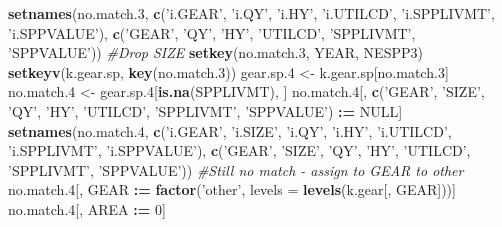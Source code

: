 \documentclass[]{article}
\newenvironment{Shaded}{\begin{snugshade}}{\end{snugshade}}
\newcommand{\KeywordTok}[1]{\textcolor[rgb]{0.13,0.29,0.53}{\textbf{#1}}}
\newcommand{\DataTypeTok}[1]{\textcolor[rgb]{0.13,0.29,0.53}{#1}}
\newcommand{\DecValTok}[1]{\textcolor[rgb]{0.00,0.00,0.81}{#1}}
\newcommand{\StringTok}[1]{\textcolor[rgb]{0.31,0.60,0.02}{#1}}
\newcommand{\CommentTok}[1]{\textcolor[rgb]{0.56,0.35,0.01}{\textit{#1}}}
\newcommand{\OtherTok}[1]{\textcolor[rgb]{0.56,0.35,0.01}{#1}}
\newcommand{\OperatorTok}[1]{\textcolor[rgb]{0.81,0.36,0.00}{\textbf{#1}}}
\newcommand{\ErrorTok}[1]{\textcolor[rgb]{0.64,0.00,0.00}{\textbf{#1}}}
\newcommand{\NormalTok}[1]{#1}
\begin{document}
\begin{Shaded}
\begin{Highlighting}[]
  \KeywordTok{setnames}\NormalTok{(no.match.}\DecValTok{3}\NormalTok{, }\KeywordTok{c}\NormalTok{(}\StringTok{'i.GEAR'}\NormalTok{, }\StringTok{'i.QY'}\NormalTok{, }\StringTok{'i.HY'}\NormalTok{, }\StringTok{'i.UTILCD'}\NormalTok{, }\StringTok{'i.SPPLIVMT'}\NormalTok{, }\StringTok{'i.SPPVALUE'}\NormalTok{), }
           \KeywordTok{c}\NormalTok{(}\StringTok{'GEAR'}\NormalTok{, }\StringTok{'QY'}\NormalTok{, }\StringTok{'HY'}\NormalTok{, }\StringTok{'UTILCD'}\NormalTok{, }\StringTok{'SPPLIVMT'}\NormalTok{, }\StringTok{'SPPVALUE'}\NormalTok{))}
  \CommentTok{#Drop SIZE}
  \KeywordTok{setkey}\NormalTok{(no.match.}\DecValTok{3}\NormalTok{, YEAR, NESPP3)}
  \KeywordTok{setkeyv}\NormalTok{(k.gear.sp, }\KeywordTok{key}\NormalTok{(no.match.}\DecValTok{3}\NormalTok{))}
\NormalTok{  gear.sp.}\DecValTok{4}\NormalTok{ <-}\StringTok{ }\NormalTok{k.gear.sp[no.match.}\DecValTok{3}\NormalTok{]}
\NormalTok{  no.match.}\DecValTok{4}\NormalTok{ <-}\StringTok{ }\NormalTok{gear.sp.}\DecValTok{4}\NormalTok{[}\KeywordTok{is.na}\NormalTok{(SPPLIVMT), ]}
\NormalTok{  no.match.}\DecValTok{4}\NormalTok{[, }\KeywordTok{c}\NormalTok{(}\StringTok{'GEAR'}\NormalTok{, }\StringTok{'SIZE'}\NormalTok{, }\StringTok{'QY'}\NormalTok{, }\StringTok{'HY'}\NormalTok{, }\StringTok{'UTILCD'}\NormalTok{, }\StringTok{'SPPLIVMT'}\NormalTok{, }\StringTok{'SPPVALUE'}\NormalTok{) }\OperatorTok{:}\ErrorTok{=}\StringTok{ }\OtherTok{NULL}\NormalTok{]}
  \KeywordTok{setnames}\NormalTok{(no.match.}\DecValTok{4}\NormalTok{, }\KeywordTok{c}\NormalTok{(}\StringTok{'i.GEAR'}\NormalTok{, }\StringTok{'i.SIZE'}\NormalTok{, }\StringTok{'i.QY'}\NormalTok{, }\StringTok{'i.HY'}\NormalTok{, }\StringTok{'i.UTILCD'}\NormalTok{, }\StringTok{'i.SPPLIVMT'}\NormalTok{, }\StringTok{'i.SPPVALUE'}\NormalTok{), }
                       \KeywordTok{c}\NormalTok{(}\StringTok{'GEAR'}\NormalTok{,   }\StringTok{'SIZE'}\NormalTok{,   }\StringTok{'QY'}\NormalTok{,   }\StringTok{'HY'}\NormalTok{,  }\StringTok{'UTILCD'}\NormalTok{,  }\StringTok{'SPPLIVMT'}\NormalTok{, }\StringTok{'SPPVALUE'}\NormalTok{))}
  \CommentTok{#Still no match - assign to GEAR to other}
\NormalTok{  no.match.}\DecValTok{4}\NormalTok{[, GEAR }\OperatorTok{:}\ErrorTok{=}\StringTok{ }\KeywordTok{factor}\NormalTok{(}\StringTok{'other'}\NormalTok{, }\DataTypeTok{levels =} \KeywordTok{levels}\NormalTok{(k.gear[, GEAR]))]}
\NormalTok{  no.match.}\DecValTok{4}\NormalTok{[, AREA }\OperatorTok{:}\ErrorTok{=}\StringTok{ }\DecValTok{0}\NormalTok{]}
  

\end{Highlighting}
\end{Shaded}
\end{document}
